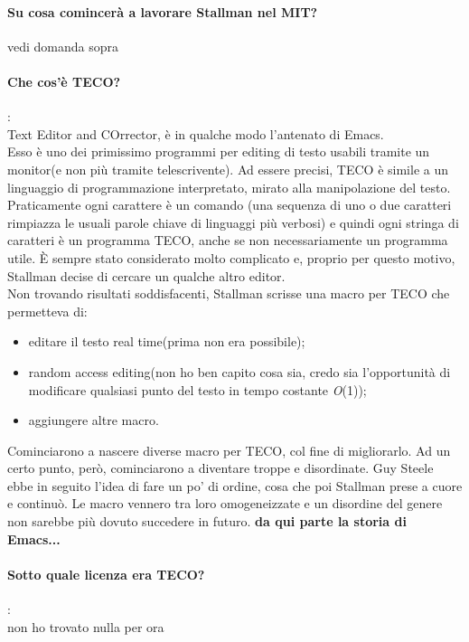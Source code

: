 \documentclass[a4paper]{article}
\begin{document}
		\paragraph{Su cosa comincerà a lavorare Stallman nel MIT?}
		vedi domanda sopra
		\paragraph{Che cos'è TECO?}: \\
		Text Editor and COrrector, è in qualche modo l'antenato di Emacs.\\
		Esso è uno dei primissimo programmi per editing di testo usabili tramite un monitor(e non più tramite telescrivente). Ad essere precisi, TECO è simile a un linguaggio di programmazione interpretato, mirato alla manipolazione del testo. Praticamente ogni carattere è un comando (una sequenza di uno o due caratteri rimpiazza le usuali parole chiave di linguaggi più verbosi) e quindi ogni stringa di caratteri è un programma TECO, anche se non necessariamente un programma utile. È sempre stato considerato molto complicato e, proprio per questo motivo, Stallman decise di cercare un qualche altro editor. \\
		Non trovando risultati soddisfacenti, Stallman scrisse una macro per TECO che permetteva di:
		\begin{itemize}
			\item editare il testo real time(prima non era possibile);
			\item random access editing(non ho ben capito cosa sia, credo sia l'opportunità di modificare qualsiasi punto del testo in tempo costante \textit{O}(1));
			\item aggiungere altre macro.
		\end{itemize}
		Cominciarono a nascere diverse macro per TECO, col fine di migliorarlo.
		Ad un certo punto, però, cominciarono a diventare troppe e disordinate. Guy Steele ebbe in seguito l'idea di fare un po' di ordine, cosa che poi Stallman prese a cuore e continuò. Le macro vennero tra loro omogeneizzate e un disordine del genere non sarebbe più dovuto succedere in futuro. \textbf{da qui parte la storia di Emacs...}
	
		\paragraph{Sotto quale licenza era TECO?}:\\
		non ho trovato nulla per ora
	
\end{document}
